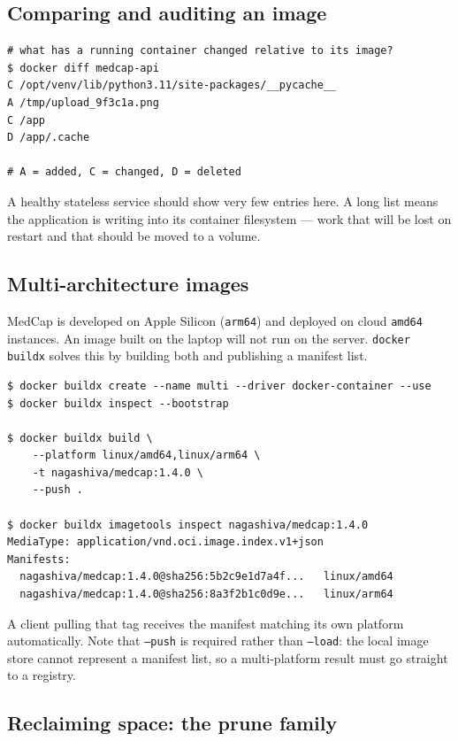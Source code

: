 \documentclass[10pt,a4paper]{article}
\newcommand{\cmd}[1]{\texttt{\small #1}}
\begin{document}
\subsection{Comparing and auditing an image}

\begin{lstlisting}[style=shell]
# what has a running container changed relative to its image?
$ docker diff medcap-api
C /opt/venv/lib/python3.11/site-packages/__pycache__
A /tmp/upload_9f3c1a.png
C /app
D /app/.cache

# A = added, C = changed, D = deleted
\end{lstlisting}

A healthy stateless service should show very few entries here. A long
list means the application is writing into its container filesystem ---
work that will be lost on restart and that should be moved to a volume.

\subsection{Multi-architecture images}

MedCap is developed on Apple Silicon (\texttt{arm64}) and deployed on
cloud \texttt{amd64} instances. An image built on the laptop will not run
on the server. \cmd{docker buildx} solves this by building both and
publishing a manifest list.

\begin{lstlisting}[style=shell]
$ docker buildx create --name multi --driver docker-container --use
$ docker buildx inspect --bootstrap

$ docker buildx build \
    --platform linux/amd64,linux/arm64 \
    -t nagashiva/medcap:1.4.0 \
    --push .

$ docker buildx imagetools inspect nagashiva/medcap:1.4.0
MediaType: application/vnd.oci.image.index.v1+json
Manifests:
  nagashiva/medcap:1.4.0@sha256:5b2c9e1d7a4f...   linux/amd64
  nagashiva/medcap:1.4.0@sha256:8a3f2b1c0d9e...   linux/arm64
\end{lstlisting}

A client pulling that tag receives the manifest matching its own
platform automatically. Note that \cmd{--push} is required rather than
\cmd{--load}: the local image store cannot represent a manifest list, so
a multi-platform result must go straight to a registry.

\subsection{Reclaiming space: the prune family}
\end{document}
